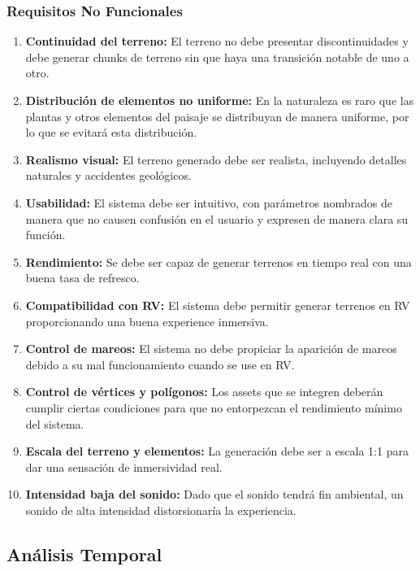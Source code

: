         \subsubsection{Requisitos No Funcionales}
            \begin{enumerate}
                \item \textbf{Continuidad del terreno:} El terreno no debe presentar discontinuidades y debe generar chunks de terreno sin que haya una transición notable de uno a otro.
                \item \textbf{Distribución de elementos no uniforme:} En la naturaleza es raro que las plantas y otros elementos del paisaje se distribuyan de manera uniforme, por lo que se evitará esta distribución.
                \item \textbf{Realismo visual:} El terreno generado debe ser realista, incluyendo detalles naturales y accidentes geológicos.
                \item \textbf{Usabilidad:} El sistema debe ser intuitivo, con parámetros nombrados de manera que no causen confusión en el usuario y expresen de manera clara su función.
                \item \textbf{Rendimiento:} Se debe ser capaz de generar terrenos en tiempo real con una buena tasa de refresco.
                \item \textbf{Compatibilidad con RV:} El sistema debe permitir generar terrenos en RV proporcionando una buena experience inmersiva.
                \item \textbf{Control de mareos:} El sistema no debe propiciar la aparición de mareos debido a su mal funcionamiento cuando se use en RV.
                \item \textbf{Control de vértices y polígonos:} Los assets que se integren deberán cumplir ciertas condiciones para que no entorpezcan el rendimiento mínimo del sistema.
                \item \textbf{Escala del terreno y elementos:} La generación debe ser a escala 1:1 para dar una sensación de inmersividad real.
                \item \textbf{Intensidad baja del sonido:} Dado que el sonido tendrá fin ambiental, un sonido de alta intensidad distorsionaría la experiencia.
            \end{enumerate}

    \subsection{Análisis Temporal}
